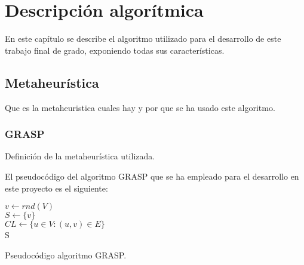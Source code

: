 
\chapter{Descripción algorítmica} %

\label{Chapter3}

En este capítulo se describe el algoritmo utilizado para el desarrollo de este trabajo final de grado, exponiendo todas sus características.

\section{Metaheurística}
Que es la metaheuristica cuales hay y por que se ha usado este algoritmo.

\subsection{GRASP}
Definición de la metaheurística utilizada.

El pseudocódigo del algoritmo GRASP que se ha empleado para el desarrollo en este proyecto es el siguiente:

\begin{algorithm}
	\SetAlgoLined
	$ v \gets rnd( V ) $ \\[0.2cm]
	$ S \gets \{ v \} $ \\[0.2cm]
	$ CL \gets \{u \in V : (u, v) \in E\} $ \\[0.2cm]
	\Return S
	\caption{Pseudocódigo algoritmo GRASP.}
\end{algorithm}

